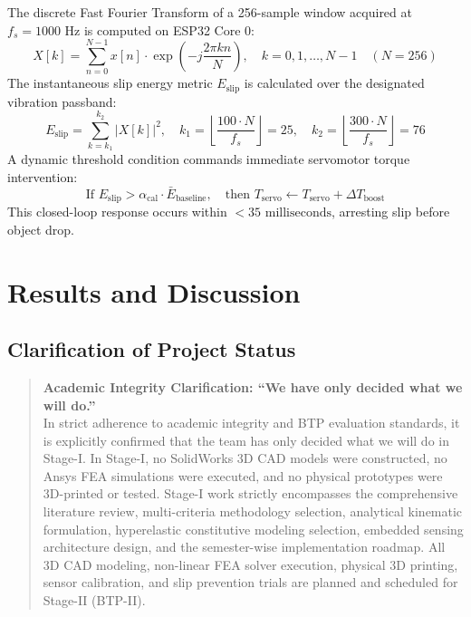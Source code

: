 \documentclass[12pt,a4paper]{report}
\begin{document}
The discrete Fast Fourier Transform of a 256-sample window acquired at $f_s = 1000\text{ Hz}$ is computed on ESP32 Core 0:
\begin{equation}
    X[k] = \sum_{n=0}^{N-1} x[n] \cdot \exp\left(-j \frac{2\pi k n}{N}\right), \quad k = 0, 1, \dots, N-1 \quad (N=256)
\end{equation}
The instantaneous slip energy metric $E_{\text{slip}}$ is calculated over the designated vibration passband:
\begin{equation}
    E_{\text{slip}} = \sum_{k = k_1}^{k_2} |X[k]|^2, \quad k_1 = \left\lfloor \frac{100 \cdot N}{f_s} \right\rfloor = 25, \quad k_2 = \left\lfloor \frac{300 \cdot N}{f_s} \right\rfloor = 76
\end{equation}
A dynamic threshold condition commands immediate servomotor torque intervention:
\begin{equation}
    \text{If } E_{\text{slip}} > \alpha_{\text{cal}} \cdot \bar{E}_{\text{baseline}}, \quad \text{then } T_{\text{servo}} \leftarrow T_{\text{servo}} + \Delta T_{\text{boost}}
\end{equation}
This closed-loop response occurs within $<35\text{ milliseconds}$, arresting slip before object drop.

\chapter{Results and Discussion}

\section{Clarification of Project Status}
\begin{quote}
\textbf{Academic Integrity Clarification: ``We have only decided what we will do.''} \\
In strict adherence to academic integrity and BTP evaluation standards, it is explicitly confirmed that the team has only decided what we will do in Stage-I. In Stage-I, no SolidWorks 3D CAD models were constructed, no Ansys FEA simulations were executed, and no physical prototypes were 3D-printed or tested. Stage-I work strictly encompasses the comprehensive literature review, multi-criteria methodology selection, analytical kinematic formulation, hyperelastic constitutive modeling selection, embedded sensing architecture design, and the semester-wise implementation roadmap. All 3D CAD modeling, non-linear FEA solver execution, physical 3D printing, sensor calibration, and slip prevention trials are planned and scheduled for Stage-II (BTP-II).
\end{quote}
\end{document}
